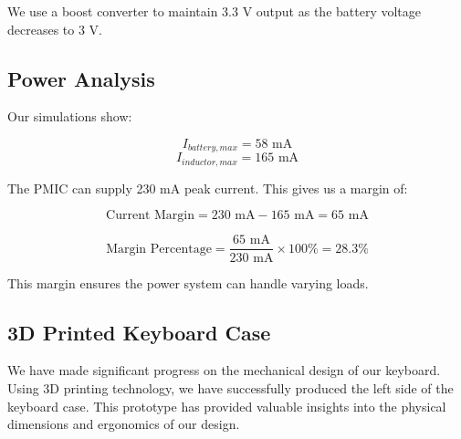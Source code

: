 \documentclass[a4paper,11pt]{article}%
\begin{document}
We use a boost converter to maintain 3.3 V output as the battery voltage decreases to 3 V.

\subsection{Power Analysis}

Our simulations show:

\begin{equation}
    I_{battery,max} = 58 \text{ mA}
\end{equation}
\begin{equation}
    I_{inductor,max} = 165 \text{ mA}
\end{equation}

The PMIC can supply 230 mA peak current. This gives us a margin of:

\begin{equation}
    \text{Current Margin} = 230 \text{ mA} - 165 \text{ mA} = 65 \text{ mA}
\end{equation}

\begin{equation}
    \text{Margin Percentage} = \frac{65 \text{ mA}}{230 \text{ mA}} \times 100\% = 28.3\%
\end{equation}

This margin ensures the power system can handle varying loads.


\subsection{3D Printed Keyboard Case}

We have made significant progress on the mechanical design of our keyboard. Using 3D printing technology, we have successfully produced the left side of the keyboard case. This prototype has provided valuable insights into the physical dimensions and ergonomics of our design.
\end{document}
